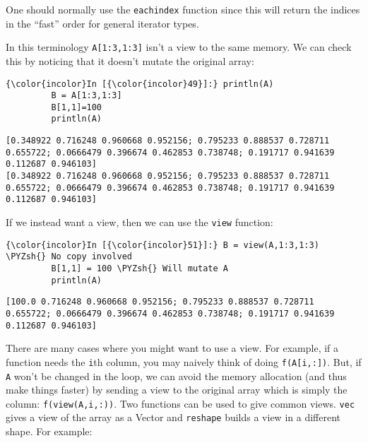 \documentclass[11pt]{article}
\def\PYZsh{\char`\#}
\begin{document}
    One should normally use the \texttt{eachindex} function since this will
return the indices in the ``fast'' order for general iterator types.

In this terminology \texttt{A{[}1:3,1:3{]}} isn't a view to the same
memory. We can check this by noticing that it doesn't mutate the
original array:

    \begin{Verbatim}[commandchars=\\\{\}]
{\color{incolor}In [{\color{incolor}49}]:} println(A)
         B = A[1:3,1:3]
         B[1,1]=100
         println(A)
\end{Verbatim}

    \begin{Verbatim}[commandchars=\\\{\}]
[0.348922 0.716248 0.960668 0.952156; 0.795233 0.888537 0.728711 0.655722; 0.0666479 0.396674 0.462853 0.738748; 0.191717 0.941639 0.112687 0.946103]
[0.348922 0.716248 0.960668 0.952156; 0.795233 0.888537 0.728711 0.655722; 0.0666479 0.396674 0.462853 0.738748; 0.191717 0.941639 0.112687 0.946103]

    \end{Verbatim}

    If we instead want a view, then we can use the \texttt{view} function:

    \begin{Verbatim}[commandchars=\\\{\}]
{\color{incolor}In [{\color{incolor}51}]:} B = view(A,1:3,1:3) \PYZsh{} No copy involved
         B[1,1] = 100 \PYZsh{} Will mutate A
         println(A)
\end{Verbatim}

    \begin{Verbatim}[commandchars=\\\{\}]
[100.0 0.716248 0.960668 0.952156; 0.795233 0.888537 0.728711 0.655722; 0.0666479 0.396674 0.462853 0.738748; 0.191717 0.941639 0.112687 0.946103]

    \end{Verbatim}

    There are many cases where you might want to use a view. For example, if
a function needs the \texttt{i}th column, you may naively think of doing
\texttt{f(A{[}i,:{]})}. But, if \texttt{A} won't be changed in the loop,
we can avoid the memory allocation (and thus make things faster) by
sending a view to the original array which is simply the column:
\texttt{f(view(A,i,:))}. Two functions can be used to give common views.
\texttt{vec} gives a view of the array as a Vector and \texttt{reshape}
builds a view in a different shape. For example:
\end{document}
